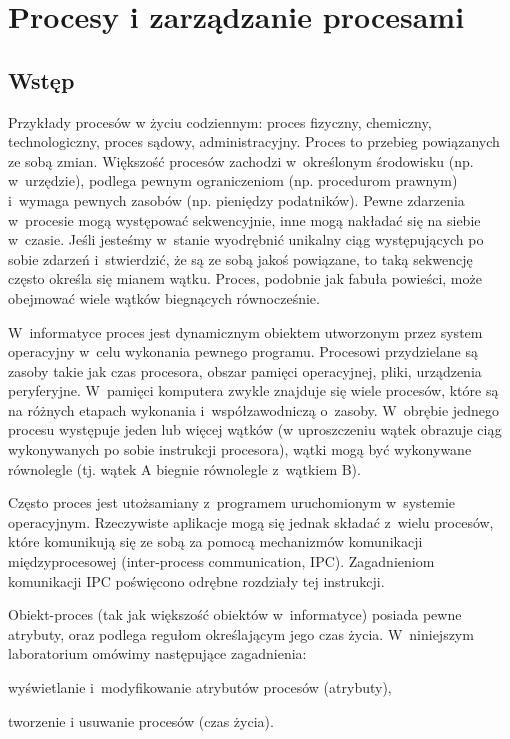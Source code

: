 \section{Procesy i zarządzanie procesami}

\subsection{Wstęp}

Przykłady procesów w życiu codziennym: proces fizyczny, chemiczny,
technologiczny, proces sądowy, administracyjny. Proces to przebieg powiązanych
ze sobą zmian. Większość procesów zachodzi w~określonym środowisku (np.
w~urzędzie), podlega pewnym ograniczeniom (np.  procedurom prawnym) i~wymaga
pewnych zasobów (np.  pieniędzy podatników). Pewne zdarzenia w~procesie
mogą występować sekwencyjnie, inne mogą nakładać się na siebie w~czasie. Jeśli
jesteśmy w~stanie wyodrębnić unikalny ciąg występujących po sobie zdarzeń
i~stwierdzić, że są ze sobą jakoś powiązane, to taką sekwencję często określa
się mianem wątku. Proces, podobnie jak fabuła powieści, może obejmować wiele
wątków biegnących równocześnie.

W~informatyce proces jest dynamicznym obiektem utworzonym przez system
operacyjny w~celu wykonania pewnego programu. Procesowi przydzielane są zasoby
takie jak czas procesora, obszar pamięci operacyjnej, pliki, urządzenia
peryferyjne. W~pamięci komputera zwykle znajduje się wiele procesów, które są
na różnych etapach wykonania i~współzawodniczą o~zasoby. W~obrębie jednego
procesu występuje jeden lub więcej wątków (w uproszczeniu wątek obrazuje ciąg
wykonywanych po sobie instrukcji procesora), wątki mogą być wykonywane
równolegle (tj. wątek A biegnie równolegle z~wątkiem B).

Często proces jest utożsamiany z~programem uruchomionym w~systemie operacyjnym.
Rzeczywiste aplikacje mogą się jednak składać z~wielu procesów, które
komunikują się ze sobą za pomocą mechanizmów komunikacji międzyprocesowej
(inter-process communication, IPC). Zagadnieniom komunikacji IPC poświęcono
odrębne rozdziały tej instrukcji.

Obiekt-proces (tak jak większość obiektów w~informatyce) posiada pewne atrybuty,
oraz podlega regułom określającym jego czas życia. W~niniejszym laboratorium
omówimy następujące zagadnienia:
\begin{myitemize}
  \item wyświetlanie i~modyfikowanie atrybutów procesów (atrybuty),
  \item tworzenie i usuwanie procesów (czas życia).
\end{myitemize}

